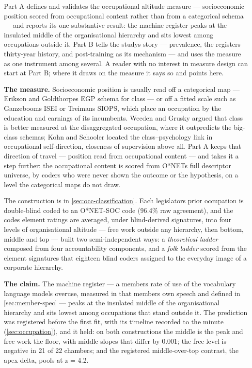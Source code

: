 Part A defines and validates the occupational altitude measure --- socioeconomic
position scored from occupational content rather than from a categorical schema ---
and reports its one substantive result: the machine register peaks at the
insulated middle of the organisational hierarchy and sits lowest among
occupations outside it. Part B tells the study\textquotesingle s story --- prevalence, the
register\textquotesingle s thirty-year history, and post-training as its mechanism --- and uses
the measure as one instrument among several. A reader with no interest in
measure design can start at Part B; where it draws on the measure it says so
and points here.

\textbf{The measure.} Socioeconomic position is usually read off a categorical
map --- Erikson and Goldthorpe\textquotesingle s\cite{erikson1992} EGP schema for class --- or off a fitted scale
such as Ganzeboom\textquotesingle s ISEI or Treiman\textquotesingle s SIOPS, which place an occupation by the
education and earnings of its incumbents. Weeden and Grusky argued that class
is better measured at the disaggregated occupation, where it outpredicts the
big-class schemas; Kohn and Schooler\cite{kohn1983} located the class--psychology link in
occupational self-direction, closeness of supervision above all. Part A keeps
that direction of travel --- position read from occupational content --- and
takes it a step further: the occupational content is scored from O*NET\textquotesingle s full descriptor
universe, by coders who were never shown the outcome or the
hypothesis, on a level the categorical maps do not draw.

The construction is in \cref{sec:occ-classification}. Each legislator\textquotesingle s prior occupation is
double-blind coded to an O*NET-SOC code (96.4\% raw agreement), and the code\textquotesingle s
element ratings are averaged, under blind-derived signatures, into four levels
of organisational altitude --- free work outside any hierarchy, then bottom,
middle and top --- built two semi-independent ways: a \emph{theoretical ladder}
composed from four accountability components, and a \emph{folk ladder} scored from
the element signatures that eighteen blind coders assigned to the everyday
image of a corporate hierarchy.

\textbf{The claim.} The machine register --- a member\textquotesingle s rate of use of the
vocabulary language models overuse, measured in that member\textquotesingle s own speech and
defined in \cref{sec:member-spec} --- peaks at the insulated
middle of the organisational hierarchy and sits lowest among occupations that
stand outside it. The prediction was registered before the first fit, with its
timeline recorded to the minute (\cref{sec:occupation}), and it held: on both constructions
the middle is the peak and free work the floor, with middle slopes that differ
by 0.001; the free level is negative in 21 of 22 chambers; and the registered
middle-over-top contrast, the apex delta, pools at z = 4.2.

